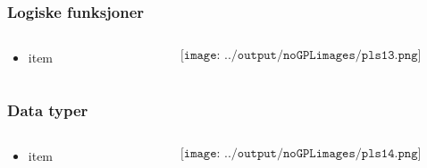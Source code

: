 \documentclass[aspectratio=169,xcolor=dvipsnames]{beamer}
\begin{document}
\begin{frame}
	\frametitle{Logiske funksjoner}
	\begin{columns}
		\begin{column}{0.5\textwidth}
			\begin{itemize}
				\item item
			\end{itemize}

			
		\end{column}

		\begin{column}{0.5\textwidth}
	$$\texttt{[image: ../output/noGPLimages/pls13.png]}$$
		\end{column}
	\end{columns}
\end{frame}

\begin{frame}
	\frametitle{Data typer}
	\begin{columns}
		\begin{column}{0.5\textwidth}
			\begin{itemize}
				\item item
			\end{itemize}

			
		\end{column}

		\begin{column}{0.5\textwidth}
	$$\texttt{[image: ../output/noGPLimages/pls14.png]}$$
		\end{column}
	\end{columns}
\end{frame}
\end{document}

